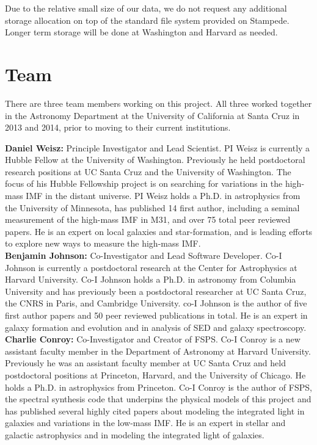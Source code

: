 \documentclass[11pt,preprint]{aastex}
\begin{document}
Due to the relative small size of our data, we do not request any additional storage allocation on top of the standard file system provided on Stampede.  Longer term storage will be done at Washington and Harvard as needed.





\section{Team}

There are three team members working on this project.  All three worked together in the Astronomy Department at the University of California at Santa Cruz in 2013 and 2014, prior to moving to their current institutions.

\textbf{Daniel Weisz:}  Principle Investigator and Lead Scientist.  PI Weisz is currently a Hubble Fellow at the University of Washington.  Previously he held postdoctoral research positions at UC Santa Cruz and the University of Washington.  The focus of his Hubble Fellowship project is on searching for variations in the high-mass IMF in the distant universe.  PI Weisz holds a Ph.D. in astrophysics from the University of Minnesota, has published 14 first author, including a seminal measurement of the high-mass IMF in M31, and over 75 total peer reviewed papers. He is an expert on local galaxies and star-formation, and is leading efforts to explore new ways to measure the high-mass IMF.  \\

\textbf{Benjamin Johnson:} Co-Investigator and Lead Software Developer.  Co-I Johnson is currently a postdoctoral research at the Center for Astrophysics at Harvard University.  Co-I Johnson holds a Ph.D. in astronomy from Columbia University and has previously been a postdoctoral researcher at UC Santa Cruz, the CNRS in Paris, and Cambridge University.  co-I Johnson is the author of five first author papers and 50 peer reviewed publications in total.  He is an expert in galaxy formation and evolution and in analysis of SED and galaxy spectroscopy.  \\

\textbf{Charlie Conroy:}  Co-Investigator and Creator of FSPS.  Co-I Conroy is a new assistant faculty member in the Department of Astronomy at Harvard University.  Previously he was an assistant faculty member at UC Santa Cruz and held postdoctoral positions at Princeton, Harvard, and the University of Chicago.  He holds a Ph.D. in astrophysics from Princeton.  Co-I Conroy is the author of FSPS, the spectral synthesis code that underpins the physical models of this project and has published several highly cited papers about modeling the integrated light in galaxies and variations in the low-mass IMF.  He is an expert in stellar and galactic astrophysics and in modeling the integrated light of galaxies. \\





\end{document}
